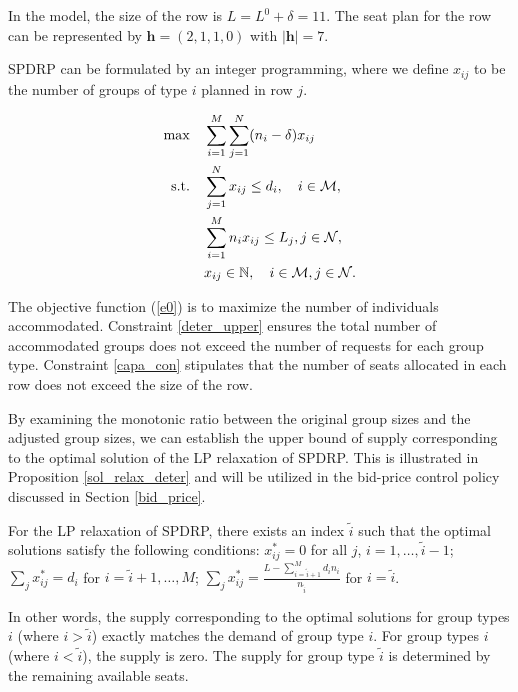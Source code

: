 In the model, the size of the row is $L = L^{0} + \delta =11$. The seat plan for the row can be represented by $\bm{h} = (2,1,1,0)$ with $|\bm{h}| = 7$.

SPDRP can be formulated by an integer programming, where we define $x_{ij}$ to be the number of groups of type $i$ planned in row $j$. 

\begin{align}
\max \quad & \sum_{i=1}^{M}  \sum_{j= 1}^{N} (n_i- \delta) x_{ij} \label{e0} \\
\text {s.t.} \quad & \sum_{j= 1}^{N} x_{ij} \leq d_{i}, \quad i \in \mathcal{M}, \label{deter_upper}\\ 
& \sum_{i=1}^{M} n_{i} x_{ij} \leq L_j, j \in \mathcal{N}, \label{capa_con} \\
& x_{ij} \in \mathbb{N}, \quad i \in \mathcal{M}, j \in \mathcal{N}. \notag 
\end{align}

The objective function (\ref{e0}) is to maximize the number of individuals accommodated. Constraint \eqref{deter_upper} ensures the total number of accommodated groups does not exceed the number of requests for each group type. Constraint \eqref{capa_con} stipulates that the number of seats allocated in each row does not exceed the size of the row.

By examining the monotonic ratio between the original group sizes and the adjusted group sizes, we can establish the upper bound of supply corresponding to the optimal solution of the LP relaxation of SPDRP. This is illustrated in Proposition \ref{sol_relax_deter} and will be utilized in the bid-price control policy discussed in Section \ref{bid_price}.

\begin{prop}\label{sol_relax_deter}
For the LP relaxation of \textup{SPDRP}, there exists an index $\tilde{i}$ such that the optimal solutions satisfy the following conditions: $x_{ij}^{*} = 0$ for all $j$, $i = 1,\ldots, \tilde{i}-1$; $\sum_{j} x_{ij}^{*} = d_{i}$ for $i = \tilde{i}+1,\ldots, M$; $\sum_{j} x_{ij}^{*} = \frac{L - \sum_{i = \tilde{i}+1}^{M} {d_i n_i}}{n_{\tilde{i}}}$ for $i = \tilde{i}$.
\end{prop}

In other words, the supply corresponding to the optimal solutions for group types $i$ (where $i > \tilde{i}$) exactly matches the demand of group type $i$. For group types $i$ (where $i < \tilde{i}$), the supply is zero. The supply for group type $\tilde{i}$ is determined by the remaining available seats.

